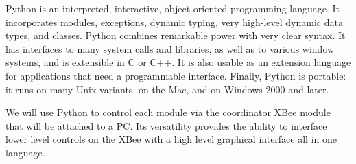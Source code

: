 \par Python is an interpreted, interactive, object-oriented programming language. It incorporates modules, exceptions, dynamic typing, very high-level dynamic data types, and classes. Python combines remarkable power with very clear syntax. It has interfaces to many system calls and libraries, as well as to various window systems, and is extensible in C or C++. It is also usable as an extension language for applications that need a programmable interface. Finally, Python is portable: it runs on many Unix variants, on the Mac, and on Windows 2000 and later.
\par We will use Python to control each module via the coordinator XBee module that will be attached to a PC. Its versatility provides the ability to interface lower level controls on the XBee with a high level graphical interface all in one language. 